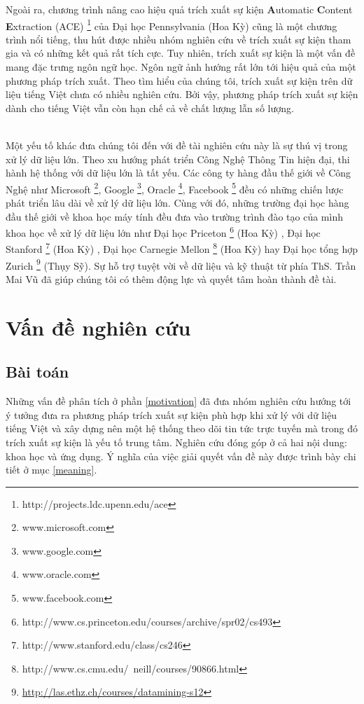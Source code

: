 Ngoài ra, chương trình nâng cao hiệu quả trích xuất sự kiện \textbf{A}utomatic \textbf{C}ontent \textbf{E}xtraction (ACE) \footnote{http://projects.ldc.upenn.edu/ace} của Đại học Pennsylvania (Hoa Kỳ) cũng là một chương trình nổi tiếng, thu hút được nhiều nhóm nghiên cứu về trích xuất sự kiện tham gia và có những kết quả rất tích cực. Tuy nhiên, trích xuất sự kiện là một vấn đề mang đặc trưng ngôn ngữ học. Ngôn ngữ ảnh hướng rất lớn tới hiệu quả của một phương pháp trích xuất. Theo tìm hiểu của chúng tôi, trích xuất sự kiện trên dữ liệu tiếng Việt chưa có nhiều nghiên cứu. Bởi vậy, phương pháp trích xuất sự kiện dành cho tiếng Việt vẫn còn hạn chế cả về chất lượng lẫn số lượng.

\\
\noindent Một yếu tố khác đưa chúng tôi đến với đề tài nghiên cứu này là sự thú vị trong xử lý dữ liệu lớn. Theo xu hướng phát triển Công Nghệ Thông Tin hiện đại, thi hành hệ thống với dữ liệu lớn là tất yếu. Các công ty hàng đầu thế giới về Công Nghệ như Microsoft \footnote{www.microsoft.com}, Google \footnote{www.google.com}, Oracle \footnote{www.oracle.com}, Facebook \footnote{www.facebook.com} đều có những chiến lược phát triển lâu dài về xử lý dữ liệu lớn. Cùng với đó, những trường đại học hàng đầu thế giới về khoa học máy tính đều đưa vào trường trình đào tạo của mình khoa học về xử lý dữ liệu lớn như Đại học Priceton \footnote{http://www.cs.princeton.edu/courses/archive/spr02/cs493} (Hoa Kỳ) , Đại học Stanford \footnote{http://www.stanford.edu/class/cs246} (Hoa Kỳ) , Đại học Carnegie Mellon \footnote{http://www.cs.cmu.edu/~neill/courses/90866.html} (Hoa Kỳ) hay Đại học tổng hợp Zurich \footnote{\href{http://las.ethz.ch/courses/datamining-s12}{http://las.ethz.ch/courses/datamining-s12}} (Thụy Sỹ). Sự hỗ trợ tuyệt vời về dữ liệu và kỹ thuật  từ phía ThS. Trần Mai Vũ đã giúp chúng tôi có thêm động lực và quyết tâm hoàn thành đề tài.



\section{Vấn đề nghiên cứu}
\label{problem}
    \subsection{Bài toán}
     Những vấn đề phân tích ở phần \ref{motivation} đã đưa nhóm nghiên cứu hướng tới ý tưởng đưa ra phương pháp trích xuất sự kiện phù hợp khi xử lý với dữ liệu tiếng Việt và xây dựng nên một hệ thống theo dõi tin tức trực tuyến mà trong đó trích xuất sự kiện là yếu tố trung tâm. Nghiên cứu đóng góp ở cả hai nội dung: khoa học và ứng dụng. Ý nghĩa của việc giải quyết vấn đề này được trình bày chi tiết ở mục \ref{meaning}.
